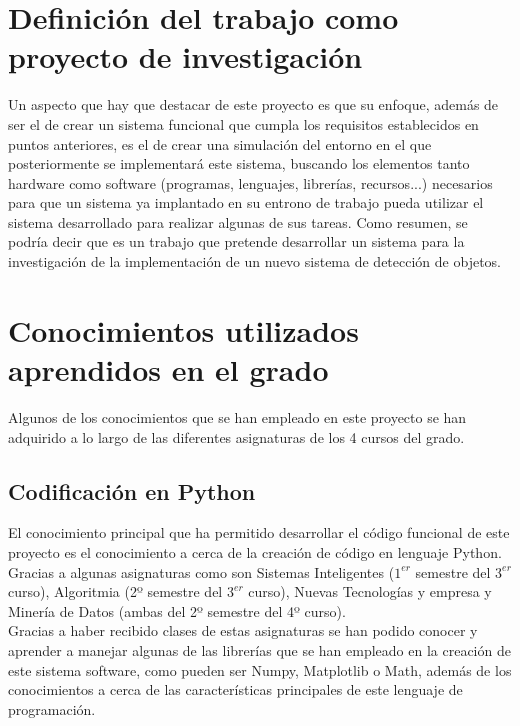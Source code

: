 
\section{Definición del trabajo como proyecto de investigación}

Un aspecto que hay que destacar de este proyecto es que su enfoque, además de ser el de crear un sistema funcional que cumpla los requisitos establecidos en puntos anteriores, es el de crear una simulación del entorno en el que posteriormente se implementará este sistema, buscando los elementos tanto hardware como software (programas, lenguajes, librerías, recursos...)  necesarios para que un sistema ya implantado en su entrono de trabajo pueda utilizar el sistema desarrollado para realizar algunas de sus tareas. Como resumen, se podría decir que es un trabajo que pretende desarrollar un sistema para la investigación de la implementación de un nuevo sistema de detección de objetos.\\

\section{Conocimientos utilizados aprendidos en el grado}

Algunos de los conocimientos que se han empleado en este proyecto se han adquirido a lo largo de las diferentes asignaturas de los 4 cursos del grado.\\

\subsection{Codificación en Python}
El conocimiento principal que ha permitido desarrollar el código funcional de este proyecto es el conocimiento a cerca de la creación de código en lenguaje Python. Gracias a algunas asignaturas como son Sistemas Inteligentes ($1^{er}$ semestre del $3^{er}$ curso), Algoritmia (2º semestre del $3^{er}$ curso), Nuevas Tecnologías y empresa y Minería de Datos (ambas del 2º semestre del 4º curso).\\
Gracias a haber recibido clases de estas asignaturas se han podido conocer y aprender a manejar algunas de las librerías que se han empleado en la creación de este sistema software, como pueden ser Numpy, Matplotlib o Math, además de los conocimientos a cerca de las características principales de este lenguaje de programación.\\

